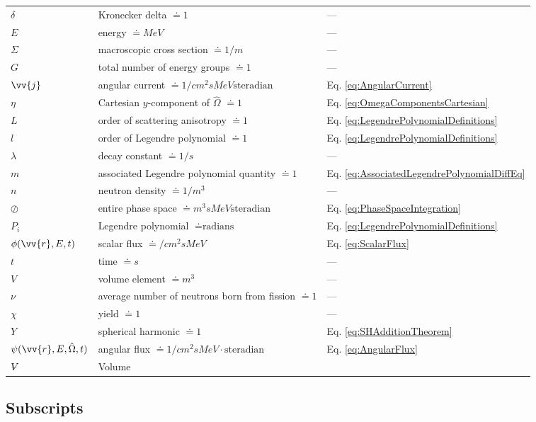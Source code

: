 \documentclass[10pt]{article}
\newcommand{\hO}{\hat{\Omega}}
\newcommand{\spa}{(\vv{r}, E, \hO, t)}
\newcommand{\spas}{(\vv{r},E,t)}
\newcommand{\volume}{\mathop{\ooalign{\hfil$V$\hfil\cr\kern0.08em--\hfil\cr}}\nolimits}
\begin{document}
\begin{flushleft}
\begin{tabular}{l l l}
\(\delta\) & Kronecker delta \(\doteq 1\) & ---\\
\(E\) & energy \(\doteq MeV\) & ---\\
\(\Sigma\) & macroscopic cross section \(\doteq 1/m\) & ---\\
\(G\) & total number of energy groups \(\doteq 1\) & ---\\
\(\vv{j}\) & angular current \(\doteq 1/cm^2sMeV\textrm{steradian}\) & Eq. \ref{eq:AngularCurrent}\\
\(\eta\) & Cartesian \(y\)-component of \(\hO  \) \(\doteq 1\) & Eq. \ref{eq:OmegaComponentsCartesian}\\
\(L\) & order of scattering anisotropy \(\doteq 1\) & Eq. \ref{eq:LegendrePolynomialDefinitions}\\
\(l\) & order of Legendre polynomial \(\doteq 1\) & Eq. \ref{eq:LegendrePolynomialDefinitions}\\
\(\lambda\) & decay constant \(\doteq 1/s\) & ---\\
\(m\) & associated Legendre polynomial quantity \(\doteq 1\) & Eq. \ref{eq:AssociatedLegendrePolynomialDiffEq}\\
\(n\) & neutron density \(\doteq 1/m^3\) & ---\\
\(\oslash\) & entire phase space \(\doteq m^3sMeV\textrm{steradian}\) & Eq. \ref{eq:PhaseSpaceIntegration}\\
\(P_i\) & Legendre polynomial \(\doteq \textrm{radians}\) & Eq. \ref{eq:LegendrePolynomialDefinitions}\\
\(\phi\spas\) & scalar flux \(\doteq /cm^2sMeV\) & Eq. \ref{eq:ScalarFlux}\\
\(t\) & time \(\doteq s\) & ---\\
\(V\) & volume element \(\doteq m^3\) & ---\\
\(\nu\) & average number of neutrons born from fission \(\doteq 1\) & ---\\
\(\chi\) & yield \(\doteq 1\) & ---\\
\(Y\) & spherical harmonic \(\doteq 1\) & Eq. \ref{eq:SHAdditionTheorem}\\
\(\psi\spa \) & angular flux \(\doteq 1/cm^2sMeV\cdot\textrm{steradian}\) & Eq. \ref{eq:AngularFlux}\\
\(\volume\) & Volume\\

\end{tabular}


\subsection{Subscripts}


\end{flushleft}
\end{document}
